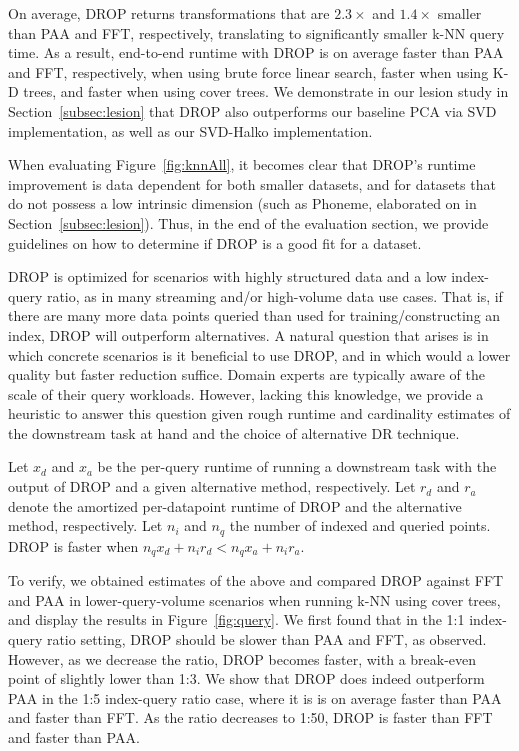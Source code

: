 On average, DROP returns transformations that are $2.3\times$ and  $1.4\times$ smaller than PAA and FFT, respectively, translating to significantly smaller k-NN query time. 
As a result, end-to-end runtime with DROP is on average  faster than PAA and FFT, respectively, when using brute force linear search,    faster when using K-D trees, and  faster when using cover trees.
We demonstrate in our lesion study in Section~\ref{subsec:lesion} that DROP also outperforms our baseline PCA via SVD implementation, as well as our SVD-Halko implementation. 

When evaluating Figure~\ref{fig:knnAll}, it becomes clear that DROP's runtime improvement is data dependent for both smaller datasets, and for datasets that do not possess a low intrinsic dimension (such as Phoneme, elaborated on in Section~\ref{subsec:lesion}). 
Thus, in the end of the evaluation section, we provide guidelines on how to determine if DROP is a good fit for a dataset. 


DROP is optimized for scenarios with highly structured data and a low index-query ratio, as in many streaming and/or high-volume data use cases.
That is, if there are many more data points queried than used for training/constructing an index, DROP will outperform alternatives. 
A natural question that arises is in which concrete scenarios is it beneficial to use DROP, and in which would a lower quality but faster reduction suffice. 
Domain experts are typically aware of the scale of their query workloads. 
However, lacking this knowledge, we provide a heuristic to answer this question given rough runtime and cardinality estimates of the downstream task at hand and the choice of alternative DR technique.

Let $x_d$ and $x_a$ be the per-query runtime of running a downstream task with the output of DROP and a given alternative method, respectively. 
Let $r_d$ and $r_a$ denote the amortized per-datapoint runtime of DROP and the alternative method, respectively. 
Let $n_i$ and $n_q$ the number of indexed and queried points. 
DROP is faster when $n_q x_d + n_i r_d < n_q x_a + n_i r_a$.

To verify, we obtained estimates of the above and compared DROP against FFT and PAA in lower-query-volume scenarios when running k-NN using cover trees, and display the results in Figure~\ref{fig:query}.
We first found that in the 1:1 index-query ratio setting, DROP should be slower than PAA and FFT, as observed. 
However, as we decrease the ratio, DROP becomes faster, with a break-even point of slightly lower than 1:3. 
We show that DROP does indeed outperform PAA  in the 1:5 index-query ratio case, where it is is on average \red{$1.51\times$} faster than PAA and \red{$1.03\times$} faster than FFT. 
As the ratio decreases to 1:50, DROP is \red{$1.24\times$} faster than FFT and \red{$1.9\times$} faster than PAA.  


